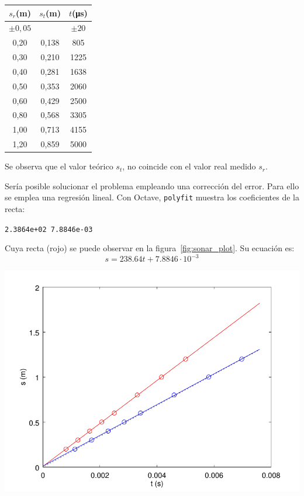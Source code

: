 \documentclass[10pt,a4paper,hidelinks,twocolumn]{article}
\begin{document}
\begin{table}[h]
\centering
\begin{tabular}{ | c | c | c | }
\hline
$s_{r}$(m) & $s_{t}$(m) & $t$(\si{\micro\second}) \\ \hline
$\pm 0,05$ &  & $\pm 20$ \\ \hline \hline
0,20 & 0,138 &  805 \\ \hline
0,30 & 0,210 & 1225 \\ \hline
0,40 & 0,281 & 1638 \\ \hline
0,50 & 0,353 & 2060 \\ \hline
0,60 & 0,429 & 2500 \\ \hline
0,80 & 0,568 & 3305 \\ \hline
1,00 & 0,713 & 4155 \\ \hline
1,20 & 0,859 & 5000 \\ \hline
\end{tabular}
\end{table}

Se observa que el valor teórico $s_t$, no coincide con el valor real medido 
$s_r$.

Sería posible solucionar el problema empleando una corrección del error. Para 
ello se emplea una regresión lineal. Con Octave, \texttt{polyfit} muestra los 
coeficientes de la recta:
\begin{center}
\texttt{2.3864e+02   7.8846e-03}
\end{center}
Cuya recta (rojo) se puede observar en la figura~\ref{fig:sonar_plot}. Su 
ecuación es:
$$s = 238.64t + 7.8846\cdot10^{-3}$$
\begin{center}
	\includegraphics[scale=0.58]{sonar.pdf}
\end{center}
\end{document}
